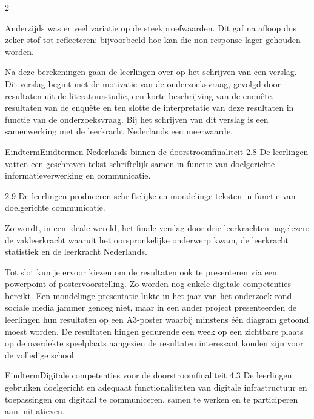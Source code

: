 \begin{multicols}{2}

   Anderzijds was er veel variatie op de steekproefwaarden. Dit gaf na afloop dus zeker stof tot reflecteren: bijvoorbeeld hoe kan die non-response lager gehouden worden.
   
    Na deze berekeningen gaan de leerlingen over op het schrijven van een verslag. Dit verslag begint met de motivatie van de onderzoeksvraag, gevolgd door resultaten uit de literatuurstudie, een korte beschrijving van de enqu\^ete, resultaten van de enqu\^ete en ten slotte de interpretatie van deze resultaten in functie van de onderzoeksvraag. Bij het schrijven van dit verslag is een samenwerking met de leerkracht Nederlands een meerwaarde.

    \begin{kader}{Eindterm}{Eindtermen Nederlands binnen de doorstroomfinaliteit}
            2.8 De leerlingen vatten een geschreven tekst schriftelijk samen in functie van doelgerichte informatieverwerking en communicatie.
            
            2.9 De leerlingen produceren schriftelijke en mondelinge teksten in functie van doelgerichte communicatie.
    \end{kader}
        
    Zo wordt, in een ideale wereld, het finale verslag door drie leerkrachten nagelezen: de vakleerkracht waaruit het oorspronkelijke onderwerp kwam, de leerkracht statistiek en de leerkracht Nederlands.

    Tot slot kun je ervoor kiezen om de resultaten ook te presenteren via een powerpoint of postervoorstelling. Zo worden nog enkele digitale competenties bereikt.   Een mondelinge presentatie lukte in het jaar van het onderzoek rond sociale media jammer genoeg niet, maar in een ander project presenteerden de leerlingen hun resultaten op een A3-poster waarbij minstens \'e\'en diagram getoond moest worden. De resultaten hingen gedurende een week op een zichtbare plaats op de overdekte speelplaats aangezien de resultaten interessant konden zijn voor de volledige school. 

 
    \begin{kader}{Eindterm}{Digitale competenties voor de      doorstroomfinaliteit}
            4.3 De leerlingen gebruiken doelgericht en adequaat functionaliteiten van digitale infrastructuur en toepassingen om digitaal te communiceren, samen te werken en te participeren aan initiatieven.
    \end{kader}
        


\end{multicols}

